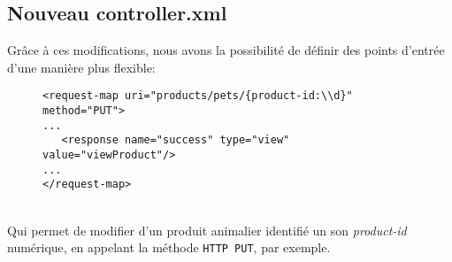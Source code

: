 \subsection{Nouveau controller.xml}
Grâce à ces modifications, nous avons la possibilité de définir des points d'entrée d'une manière plus flexible:
\begin{figure}[h!]
	\begin{lstlisting}[frame=leftline]
<request-map uri="products/pets/{product-id:\\d}" method="PUT">
...
   <response name="success" type="view" value="viewProduct"/>
...
</request-map>
	\end{lstlisting}
\end{figure}\\
Qui permet de modifier d'un produit animalier identifié un son \emph{product-id} numérique, en appelant la méthode \verb|HTTP PUT|, par exemple. 
\newpage
